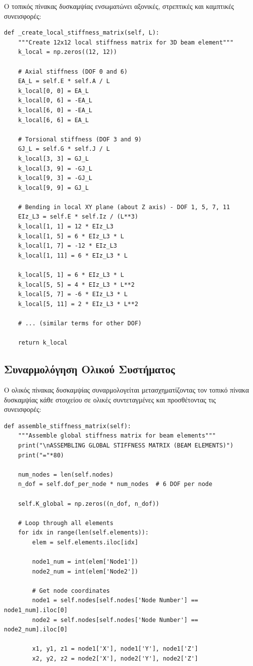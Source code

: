 \documentclass[12pt,a4paper]{article}
\begin{document}
Ο τοπικός πίνακας δυσκαμψίας ενσωματώνει αξονικές, στρεπτικές και καμπτικές συνεισφορές:

\begin{lstlisting}[caption={Συναρμολόγηση Τοπικού Πίνακα Δυσκαμψίας (Μερική)}]
def _create_local_stiffness_matrix(self, L):
    """Create 12x12 local stiffness matrix for 3D beam element"""
    k_local = np.zeros((12, 12))
    
    # Axial stiffness (DOF 0 and 6)
    EA_L = self.E * self.A / L
    k_local[0, 0] = EA_L
    k_local[0, 6] = -EA_L
    k_local[6, 0] = -EA_L
    k_local[6, 6] = EA_L
    
    # Torsional stiffness (DOF 3 and 9)
    GJ_L = self.G * self.J / L
    k_local[3, 3] = GJ_L
    k_local[3, 9] = -GJ_L
    k_local[9, 3] = -GJ_L
    k_local[9, 9] = GJ_L
    
    # Bending in local XY plane (about Z axis) - DOF 1, 5, 7, 11
    EIz_L3 = self.E * self.Iz / (L**3)
    k_local[1, 1] = 12 * EIz_L3
    k_local[1, 5] = 6 * EIz_L3 * L
    k_local[1, 7] = -12 * EIz_L3
    k_local[1, 11] = 6 * EIz_L3 * L
    
    k_local[5, 1] = 6 * EIz_L3 * L
    k_local[5, 5] = 4 * EIz_L3 * L**2
    k_local[5, 7] = -6 * EIz_L3 * L
    k_local[5, 11] = 2 * EIz_L3 * L**2
    
    # ... (similar terms for other DOF)
    
    return k_local
\end{lstlisting}

\subsection{Συναρμολόγηση Ολικού Συστήματος}

Ο ολικός πίνακας δυσκαμψίας συναρμολογείται μετασχηματίζοντας τον τοπικό πίνακα δυσκαμψίας κάθε στοιχείου σε ολικές συντεταγμένες και προσθέτοντας τις συνεισφορές:

\begin{lstlisting}[caption={Συναρμολόγηση Ολικού Πίνακα Δυσκαμψίας (Μερική)}]
def assemble_stiffness_matrix(self):
    """Assemble global stiffness matrix for beam elements"""
    print("\nASSEMBLING GLOBAL STIFFNESS MATRIX (BEAM ELEMENTS)")
    print("="*80)
    
    num_nodes = len(self.nodes)
    n_dof = self.dof_per_node * num_nodes  # 6 DOF per node
    
    self.K_global = np.zeros((n_dof, n_dof))
    
    # Loop through all elements
    for idx in range(len(self.elements)):
        elem = self.elements.iloc[idx]
        
        node1_num = int(elem['Node1'])
        node2_num = int(elem['Node2'])
        
        # Get node coordinates
        node1 = self.nodes[self.nodes['Node Number'] == node1_num].iloc[0]
        node2 = self.nodes[self.nodes['Node Number'] == node2_num].iloc[0]
        
        x1, y1, z1 = node1['X'], node1['Y'], node1['Z']
        x2, y2, z2 = node2['X'], node2['Y'], node2['Z']
\end{lstlisting}
\end{document}
